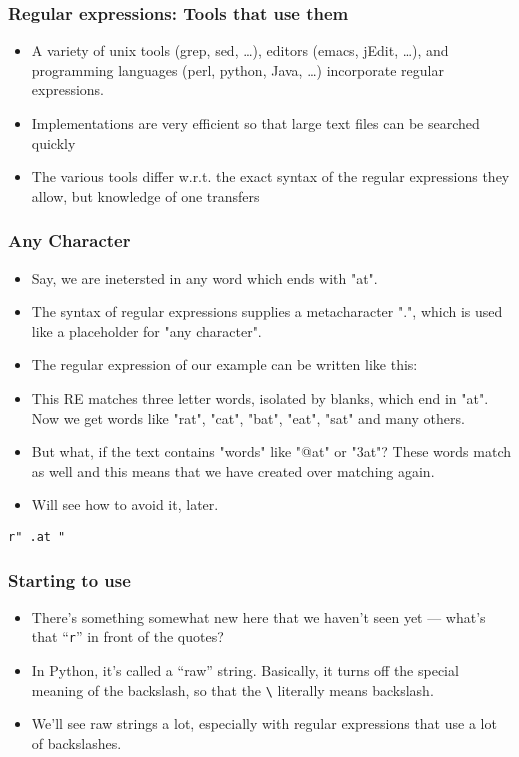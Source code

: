  \begin{frame}[fragile]
  \frametitle{Regular expressions: Tools that use them}

  \begin{itemize}
  \item A variety of unix tools (grep, sed, \ldots), editors (emacs,
    jEdit, \ldots), and programming languages (perl, python, Java, \ldots)
    incorporate regular expressions.

  \item Implementations are very efficient so that large text files
    can be searched quickly
\item The various tools differ w.r.t. the exact syntax of the regular
expressions they allow, but knowledge of one transfers
  \end{itemize}
\end{frame}


 \begin{frame}[fragile]
\frametitle{Any Character}

\begin{itemize}
\item Say, we are inetersted in any word which ends with "at".
\item The syntax of regular expressions supplies a metacharacter ".", which is used like a placeholder for "any character". 
\item The regular expression of our example can be written like this: 
\item This RE matches three letter words, isolated by blanks, which end in "at". Now we get words like "rat", "cat", "bat", "eat", "sat" and many others. 
\item But what, if the text contains "words" like "@at" or "3at"? These words match as well and this means that we have created over matching again. 
\item Will see how to avoid it, later.
\end{itemize}


\begin{lstlisting}
r" .at " 
\end{lstlisting}
\end{frame}

 \begin{frame}[fragile]
\frametitle{Starting to use}
\begin{itemize}
\item There's something somewhat new here that we haven't seen yet ---
what's that ``\texttt{r}'' in front of the quotes?  
\item  In Python, it's
called a ``raw'' string.  Basically, it turns off the special meaning
of the backslash, so that the \lstinline+\+ literally means backslash.
\item We'll see raw strings a lot, especially with regular expressions that
use a lot of backslashes.
\end{itemize}
\end{frame}

